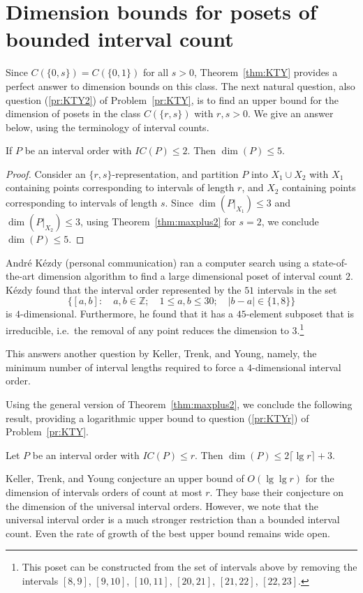 \section{Dimension bounds for posets of bounded interval count}
\label{sec:KTYq}

Since $C(\{0,s\})=C(\{0,1\})$ for all $s>0$, Theorem~\ref{thm:KTY} provides a perfect answer to dimension bounds on this class. The next natural question, also question (\ref{pr:KTY2}) of Problem~\ref{pr:KTY}, is to find an upper bound for the dimension of posets in the class $C(\{r,s\})$ with $r,s>0$. We give an answer below, using the terminology of interval counts.

\begin{proposition}\label{prop:KTY2}
If $P$ be an interval order with $IC(P)\leq 2$. Then $\dim(P)\leq 5$.
\end{proposition}

\begin{proof}
Consider an $\{r,s\}$-representation, and partition $P$ into $X_1\cup X_2$ with $X_1$ containing points corresponding to intervals of length $r$, and $X_2$ containing points corresponding to intervals of length $s$. Since $\dim(P|_{X_1})\leq 3$ and $\dim(P|_{X_2})\leq 3$, using Theorem~\ref{thm:maxplus2} for $s=2$, we conclude $\dim(P)\leq 5$.
\end{proof}

Andr\'e K\'ezdy (personal communication) ran a computer search using a state-of-the-art dimension algorithm to find a large dimensional poset of interval count $2$.
K\'ezdy found that the interval order represented by the $51$ intervals in the set
\[
\{[a,b]:\quad a,b\in\mathbb{Z};\quad 1\leq a,b\leq 30;\quad|b-a|\in\{1,8\}\}
\]
is $4$-dimensional. Furthermore, he found that it has a $45$-element subposet that is irreducible, i.e.\ the removal of any point reduces the dimension to $3$.\footnote{This poset can be constructed from the set of intervals above by removing the intervals $[8, 9]$, $[9, 10]$, $[10, 11]$, $[20, 21]$, $[21, 22]$, $[22, 23]$.}

This answers another question by Keller, Trenk, and Young, namely, the minimum number of interval lengths required to force a $4$-dimensional interval order.

Using the general version of Theorem~\ref{thm:maxplus2}, we conclude the following result, providing a logarithmic upper bound to question (\ref{pr:KTYr}) of Problem~\ref{pr:KTY}.

\begin{proposition}
Let $P$ be an interval order with $IC(P)\leq r$. Then $\dim(P)\leq 2\lceil\lg r\rceil+3$.
\end{proposition}

Keller, Trenk, and Young conjecture an upper bound of $O(\lg\lg r)$ for the dimension of intervals orders of count at most $r$. They base their conjecture on the dimension of the universal interval orders. However, we note that the universal interval order is a much stronger restriction than a bounded interval count. Even the rate of growth of the best upper bound remains wide open.

